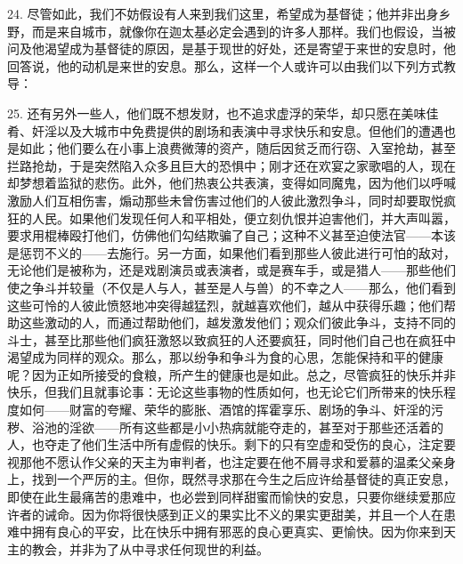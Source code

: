 24. 尽管如此，我们不妨假设有人来到我们这里，希望成为基督徒；他并非出身乡野，而是来自城市，就像你在迦太基必定会遇到的许多人那样。我们也假设，当被问及他渴望成为基督徒的原因，是基于现世的好处，还是寄望于来世的安息时，他回答说，他的动机是来世的安息。那么，这样一个人或许可以由我们以下列方式教导：\par

25. 还有另外一些人，他们既不想发财，也不追求虚浮的荣华，却只愿在美味佳肴、奸淫以及大城市中免费提供的剧场和表演中寻求快乐和安息。但他们的遭遇也是如此；他们要么在小事上浪费微薄的资产，随后因贫乏而行窃、入室抢劫，甚至拦路抢劫，于是突然陷入众多且巨大的恐惧中；刚才还在欢宴之家歌唱的人，现在却梦想着监狱的悲伤。此外，他们热衷公共表演，变得如同魔鬼，因为他们以呼喊激励人们互相伤害，煽动那些未曾伤害过他们的人彼此激烈争斗，同时却要取悦疯狂的人民。如果他们发现任何人和平相处，便立刻仇恨并迫害他们，并大声叫嚣，要求用棍棒殴打他们，仿佛他们勾结欺骗了自己；这种不义甚至迫使法官——本该是惩罚不义的——去施行。另一方面，如果他们看到那些人彼此进行可怕的敌对，无论他们是被称为，还是戏剧演员或表演者，或是赛车手，或是猎人——那些他们使之争斗并较量（不仅是人与人，甚至是人与兽）的不幸之人——那么，他们看到这些可怜的人彼此愤怒地冲突得越猛烈，就越喜欢他们，越从中获得乐趣；他们帮助这些激动的人，而通过帮助他们，越发激发他们；观众们彼此争斗，支持不同的斗士，甚至比那些他们疯狂激怒以致疯狂的人还要疯狂，同时他们自己也在疯狂中渴望成为同样的观众。那么，那以纷争和争斗为食的心思，怎能保持和平的健康呢？因为正如所接受的食粮，所产生的健康也是如此。总之，尽管疯狂的快乐并非快乐，但我们且就事论事：无论这些事物的性质如何，也无论它们所带来的快乐程度如何——财富的夸耀、荣华的膨胀、酒馆的挥霍享乐、剧场的争斗、奸淫的污秽、浴池的淫欲——所有这些都是小小热病就能夺走的，甚至对于那些还活着的人，也夺走了他们生活中所有虚假的快乐。剩下的只有空虚和受伤的良心，注定要视那他不愿认作父亲的天主为审判者，也注定要在他不屑寻求和爱慕的温柔父亲身上，找到一个严厉的主。但你，既然寻求那在今生之后应许给基督徒的真正安息，即使在此生最痛苦的患难中，也必尝到同样甜蜜而愉快的安息，只要你继续爱那应许者的诫命。因为你将很快感到正义的果实比不义的果实更甜美，并且一个人在患难中拥有良心的平安，比在快乐中拥有邪恶的良心更真实、更愉快。因为你来到天主的教会，并非为了从中寻求任何现世的利益。\par

